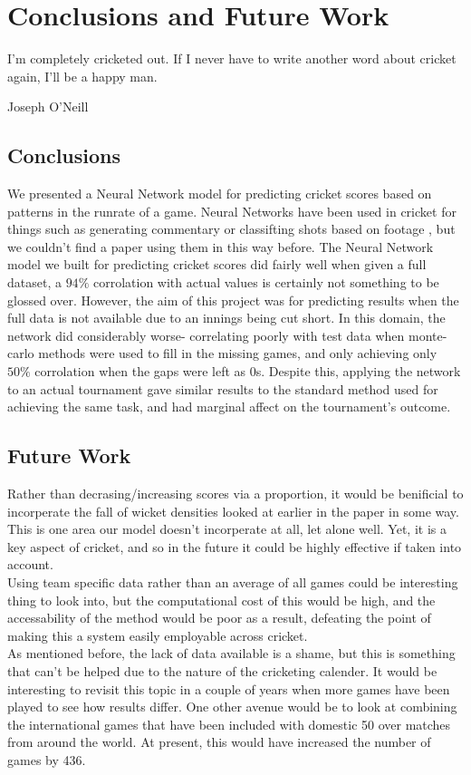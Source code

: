 \chapter{Conclusions and Future Work}

\epigraph{I'm completely cricketed out. If I never have to write another word about cricket again, I'll be a happy man.}{Joseph O'Neill}

\section{Conclusions}
We presented a Neural Network model for predicting cricket scores based on patterns in the runrate of a game. Neural Networks have been used in cricket for things such as 
generating commentary \cite{kumar2} or classifting shots based on footage \cite{foysal}, but we couldn't find a paper using them in this way before. 
The Neural Network model we built for predicting cricket scores did fairly well when given a full dataset, a $94\%$ corrolation with actual values is certainly not 
something to be glossed over. However, the aim of this project was for predicting results when the full data is not available due to an innings being cut short. 
In this domain, the network did considerably worse- correlating poorly with test data when monte-carlo methods were used to fill in the missing games, and only achieving only $50\%$ 
corrolation when the gaps were left as 0s. Despite this, applying the network to an actual tournament gave similar results to the standard method used for achieving the same task, and had 
marginal affect on the tournament's outcome. 


\section{Future Work}
Rather than decrasing/increasing scores via a proportion, it would be benificial to incorperate the fall of wicket densities looked at earlier in the paper in some way. This is one 
area our model doesn't incorperate at all, let alone well. Yet, it is a key aspect of cricket, and so in the future it could be highly effective if taken into account. \\

Using team specific data rather than an average of all games could be interesting thing to look into, but the computational cost of this would be high, and the accessability of the 
method would be poor as a result, defeating the point of making this a system easily employable across cricket. \\

As mentioned before, the lack of data available is a shame, but this is something that can't be helped due to the nature of the cricketing calender. It would be interesting to revisit this topic in a couple of years when more games have been played to see how results differ. One other avenue would be to look at combining the international games that have been included with domestic 50 over matches from around the world. At present, this would have increased the number of games by 436. 